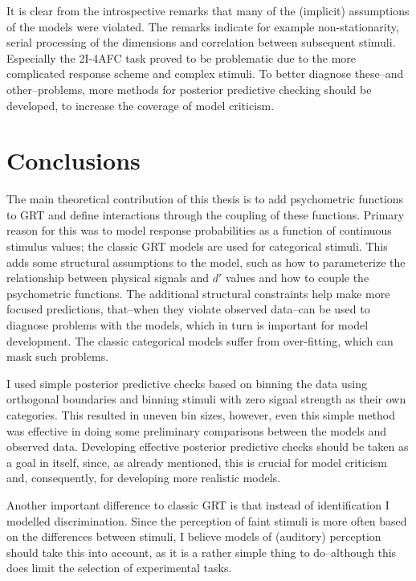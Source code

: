 \documentclass{article}\usepackage{knitr}
\begin{document}
It is clear from the introspective remarks that many of the (implicit) assumptions of the models were violated. The remarks indicate for example non-stationarity, serial processing of the dimensions and correlation between subsequent stimuli. Especially the 2I-4AFC task proved to be problematic due to the more complicated response scheme and complex stimuli.  To better diagnose these--and other--problems, more methods for posterior predictive checking should be developed, to increase the coverage of model criticism. 

\newpage


\section{Conclusions}

The main theoretical contribution of this thesis is to add psychometric functions to GRT and define interactions through the coupling of these functions. Primary reason for this was to model response probabilities as a function of continuous stimulus values; the classic GRT models are used for categorical stimuli. This adds some structural assumptions to the model, such as how to parameterize the relationship between physical signals and $d'$ values and how to couple the psychometric functions. The additional structural constraints help make more focused predictions, that--when they violate observed data--can be used to diagnose problems with the models, which in turn is important for model development. The classic categorical models suffer from over-fitting, which can mask such problems.

I used simple posterior predictive checks based on binning the data using orthogonal boundaries and binning stimuli with zero signal strength as their own categories. This resulted in uneven bin sizes, however, even this simple method was effective in doing some preliminary comparisons between the models and observed data. Developing effective posterior predictive checks should be taken as a goal in itself, since, as already mentioned, this is crucial for model criticism and, consequently, for developing more realistic models.  

Another important difference to classic GRT is that instead of identification I modelled discrimination. Since the perception of faint stimuli is more often based on the differences between stimuli, I believe models of (auditory) perception should take this into account, as it is a rather simple thing to do--although this does limit the selection of experimental tasks. 
\end{document}
